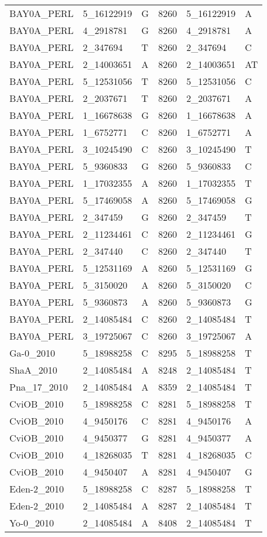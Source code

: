 \begin{center}
\begin{longtable}{|l|l|l|l|l|l|}
BAY0A\_PERL&5\_16122919&G&8260&5\_16122919&A\\
BAY0A\_PERL&4\_2918781&G&8260&4\_2918781&A\\
BAY0A\_PERL&2\_347694&T&8260&2\_347694&C\\
BAY0A\_PERL&2\_14003651&A&8260&2\_14003651&AT\\
BAY0A\_PERL&5\_12531056&T&8260&5\_12531056&C\\
BAY0A\_PERL&2\_2037671&T&8260&2\_2037671&A\\
BAY0A\_PERL&1\_16678638&G&8260&1\_16678638&A\\
BAY0A\_PERL&1\_6752771&C&8260&1\_6752771&A\\
BAY0A\_PERL&3\_10245490&C&8260&3\_10245490&T\\
BAY0A\_PERL&5\_9360833&G&8260&5\_9360833&C\\
BAY0A\_PERL&1\_17032355&A&8260&1\_17032355&T\\
BAY0A\_PERL&5\_17469058&A&8260&5\_17469058&G\\
BAY0A\_PERL&2\_347459&G&8260&2\_347459&T\\
BAY0A\_PERL&2\_11234461&C&8260&2\_11234461&G\\
BAY0A\_PERL&2\_347440&C&8260&2\_347440&T\\
BAY0A\_PERL&5\_12531169&A&8260&5\_12531169&G\\
BAY0A\_PERL&5\_3150020&A&8260&5\_3150020&C\\
BAY0A\_PERL&5\_9360873&A&8260&5\_9360873&G\\
BAY0A\_PERL&2\_14085484&C&8260&2\_14085484&T\\
BAY0A\_PERL&3\_19725067&C&8260&3\_19725067&A\\
Ga-0\_2010&5\_18988258&C&8295&5\_18988258&T\\
ShaA\_2010&2\_14085484&A&8248&2\_14085484&T\\
Pna\_17\_2010&2\_14085484&A&8359&2\_14085484&T\\
CviOB\_2010&5\_18988258&C&8281&5\_18988258&T\\
CviOB\_2010&4\_9450176&C&8281&4\_9450176&A\\
CviOB\_2010&4\_9450377&G&8281&4\_9450377&A\\
CviOB\_2010&4\_18268035&T&8281&4\_18268035&C\\
CviOB\_2010&4\_9450407&A&8281&4\_9450407&G\\
Eden-2\_2010&5\_18988258&C&8287&5\_18988258&T\\
Eden-2\_2010&2\_14085484&A&8287&2\_14085484&T\\
Yo-0\_2010&2\_14085484&A&8408&2\_14085484&T\\

\end{longtable}
\end{center}
